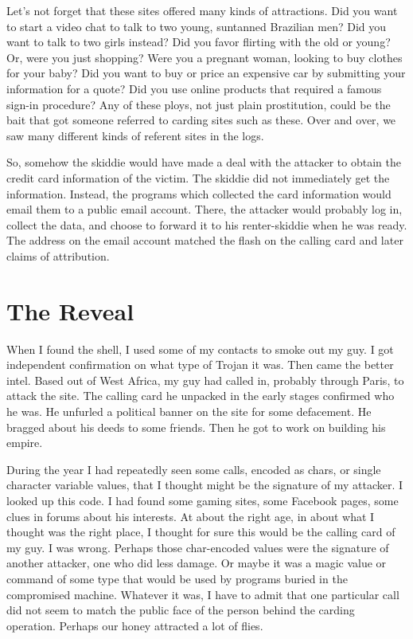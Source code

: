 Let's not forget that these sites offered many kinds of attractions.  Did you want to start a video chat to talk to two young, suntanned Brazilian men?  Did you want to talk to two girls instead?  Did you favor flirting with the old or young?  Or, were you just shopping?  Were you a pregnant woman, looking to buy clothes for your baby?  Did you want to buy or price an expensive car by submitting your information for a quote?  Did you use online products that required a famous sign-in procedure?  Any of these ploys, not just plain prostitution, could be the bait that got someone referred to carding sites such as these.  Over and over, we saw many different kinds of referent sites in the logs.

So, somehow the skiddie would have made a deal with the attacker to obtain the credit card information of the victim.  The skiddie did not immediately get the information.  Instead, the programs which collected the card information would email them to a public email account.  There, the attacker would probably log in, collect the data, and choose to forward it to his renter-skiddie when he was ready.  The address on the email account matched the flash on the calling card and later claims of attribution.

\section{The Reveal}

When I found the shell, I used some of my contacts to smoke out my guy.  I got independent confirmation on what type of Trojan it was.  Then came the better intel.  Based out of West Africa, my guy had called in, probably through Paris, to \gls{attack} the site.  The calling card he unpacked in the early stages confirmed who he was.  He unfurled a political banner on the site for some defacement.  He bragged about his deeds to some friends.  Then he got to work on building his empire.

During the year I had repeatedly seen some calls, encoded as chars, or single character variable values, that I thought might be the signature of my attacker.  I looked up this code.  I had found some gaming sites, some Facebook pages, some clues in forums about his interests.  At about the right age, in about what I thought was the right place, I thought for sure this would be the calling card of my guy.  I was wrong.  Perhaps those char-encoded values were the signature of another attacker, one who did less damage.  Or maybe it was a magic value or command of some type that would be used by programs buried in the compromised machine.  Whatever it was, I have to admit that one particular call did not seem to match the public face of the person behind the carding operation.  Perhaps our honey attracted a lot of flies.

